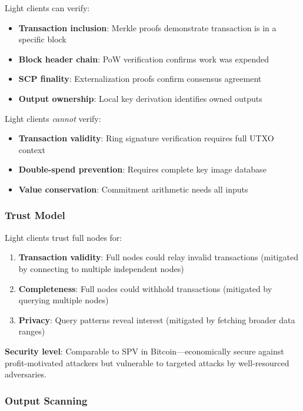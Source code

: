 Light clients can verify:
\begin{itemize}
  \item \textbf{Transaction inclusion}: Merkle proofs demonstrate transaction
    is in a specific block
  \item \textbf{Block header chain}: PoW verification confirms work was expended
  \item \textbf{SCP finality}: Externalization proofs confirm consensus agreement
  \item \textbf{Output ownership}: Local key derivation identifies owned outputs
\end{itemize}

Light clients \emph{cannot} verify:
\begin{itemize}
  \item \textbf{Transaction validity}: Ring signature verification requires
    full UTXO context
  \item \textbf{Double-spend prevention}: Requires complete key image database
  \item \textbf{Value conservation}: Commitment arithmetic needs all inputs
\end{itemize}

\subsubsection{Trust Model}

Light clients trust full nodes for:

\begin{enumerate}
  \item \textbf{Transaction validity}: Full nodes could relay invalid
    transactions (mitigated by connecting to multiple independent nodes)
  \item \textbf{Completeness}: Full nodes could withhold transactions
    (mitigated by querying multiple nodes)
  \item \textbf{Privacy}: Query patterns reveal interest (mitigated by
    fetching broader data ranges)
\end{enumerate}

\textbf{Security level}: Comparable to SPV in Bitcoin---economically secure
against profit-motivated attackers but vulnerable to targeted attacks by
well-resourced adversaries.

\subsubsection{Output Scanning}

